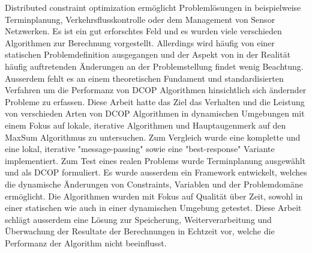 \begin{zusammenfassung}
Distributed constraint optimization erm{\"o}glicht Probleml{\"o}sungen in beispielweise Terminplanung, Verkehrsflusskontrolle oder dem Management von Sensor Netzwerken. Es ist ein gut erforschtes Feld und es wurden viele verschieden Algorithmen zur Berechnung vorgestellt. Allerdings wird h{\"a}ufig von einer statischen Problemdefinition ausgegangen und der Aspekt von in der Realit{\"a}t h{\"a}ufig auftretenden {\"A}nderungen an der Problemstellung findet wenig Beachtung. Ausserdem fehlt es an einem theoretischen Fundament und standardisierten Verfahren um die Performanz von DCOP Algorithmen hinsichtlich sich {\"a}ndernder Probleme zu erfassen. Diese Arbeit hatte das Ziel das Verhalten und die Leistung von verschieden Arten von DCOP Algorithmen in dynamischen Umgebungen mit einem Fokus auf lokale, iterative Algorithmen und Hauptaugenmerk auf den MaxSum Algorithmus zu untersuchen. Zum Vergleich wurde eine komplette und eine lokal, iterative "message-passing" sowie eine "best-response" Variante implementiert. Zum Test eines realen Problems wurde Terminplanung ausgew{\"a}hlt und als DCOP formuliert. Es wurde ausserdem ein Framework entwickelt, welches die dynamische {\"A}nderungen von Constraints, Variablen und der Problemdom{\"a}ne erm{\"o}glicht. Die Algorithmen wurden mit Fokus auf Qualit{\"a}t {\"u}ber Zeit, sowohl in einer statischen wie auch in einer dynamischen Umgebung getestet. Diese Arbeit schl{\"a}gt ausserdem eine L{\"o}sung zur Speicherung, Weiterverarbeitung und {\"U}berwachung der Resultate der Berechnungen in Echtzeit vor, welche die Performanz der Algorithm nicht beeinflusst.
\end{zusammenfassung}


